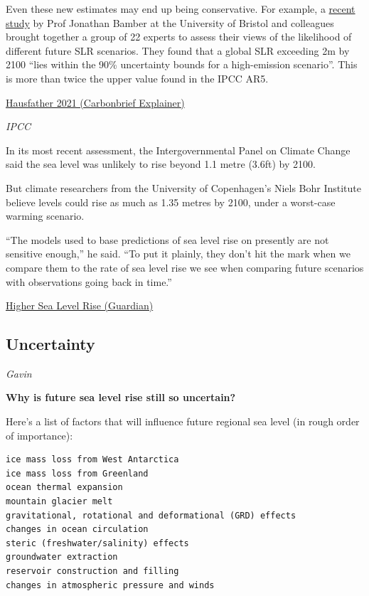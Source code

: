 \documentclass[
]{book}
\begin{document}
Even these new estimates may end up being conservative. For example, a \href{https://www.pnas.org/content/116/23/11195}{recent study} by Prof Jonathan Bamber at the University of Bristol and colleagues brought together a group of 22 experts to assess their views of the likelihood of different future SLR scenarios. They found that a global SLR exceeding 2m by 2100 ``lies within the 90\% uncertainty bounds for a high-emission scenario''. This is more than twice the upper value found in the IPCC AR5.

\href{https://www.carbonbrief.org/explainer-how-climate-change-is-accelerating-sea-level-rise}{Hausfather 2021 (Carbonbrief Explainer)}

\emph{IPCC}

In its most recent assessment, the Intergovernmental Panel on Climate Change said the sea level was unlikely to rise beyond 1.1 metre (3.6ft) by 2100.

But climate researchers from the University of Copenhagen's Niels Bohr Institute believe levels could rise as much as 1.35 metres by 2100, under a worst-case warming scenario.

``The models used to base predictions of sea level rise on presently are not sensitive enough,'' he said. ``To put it plainly, they don't hit the mark when we compare them to the rate of sea level rise we see when comparing future scenarios with observations going back in time.''

\href{https://www.theguardian.com/environment/2021/feb/02/sea-level-rise-could-be-worse-than-feared-warn-researchers}{Higher Sea Level Rise (Guardian)}

\hypertarget{uncertainty}{%
\subsection{Uncertainty}\label{uncertainty}}

\emph{Gavin}

\textbf{Why is future sea level rise still so uncertain?}

Here's a list of factors that will influence future regional sea level (in rough order of importance):

\begin{verbatim}
ice mass loss from West Antarctica
ice mass loss from Greenland
ocean thermal expansion
mountain glacier melt
gravitational, rotational and deformational (GRD) effects
changes in ocean circulation
steric (freshwater/salinity) effects
groundwater extraction
reservoir construction and filling
changes in atmospheric pressure and winds
\end{verbatim}
\end{document}
